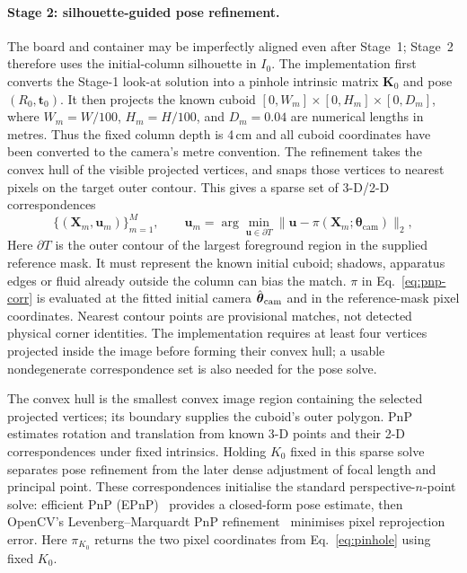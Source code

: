 \paragraph{Stage 2: silhouette-guided pose refinement.}
The board and container may be imperfectly aligned even after
Stage~1; Stage~2 therefore uses the
initial-column silhouette in $I_0$. The implementation
first converts the Stage-1 look-at solution into a pinhole intrinsic
matrix $\mathbf{K}_0$ and pose $(R_0,\mathbf{t}_0)$. It then projects the
known cuboid $[0,W_m]\times[0,H_m]\times[0,D_m]$, where
$W_m=W/100$, $H_m=H/100$, and $D_m=0.04$ are numerical lengths
in metres. Thus the fixed column depth is 4\,cm and all cuboid
coordinates have been converted to the camera's metre convention.
The refinement takes the convex
hull of the visible
projected vertices, and snaps those vertices to nearest pixels on the
target outer contour. This gives a sparse set of 3-D/2-D
correspondences
\begin{equation}
\label{eq:pnp-corr}
    \{(\mathbf{X}_m,\mathbf{u}_m)\}_{m=1}^{M},
    \qquad
    \mathbf{u}_m
    =
    \arg\min_{\mathbf{u}\in\partial T}
    \|\mathbf{u}-\pi(\mathbf{X}_m;\boldsymbol{\theta}_{\mathrm{cam}})\|_2 ,
\end{equation}
Here $\partial T$ is the outer contour of the largest foreground
region in the supplied reference mask. It must represent the known
initial cuboid; shadows, apparatus edges or fluid already outside the
column can bias the match. $\pi$ in Eq.~\eqref{eq:pnp-corr} is evaluated
at the fitted initial camera $\hat{\boldsymbol\theta}_{\rm cam}$ and
in the reference-mask pixel coordinates. Nearest contour points are
provisional matches, not detected physical corner identities. The
implementation requires at least four vertices projected inside the
image before forming their convex hull; a usable nondegenerate
correspondence set is also needed for the pose solve.

The convex hull is the smallest convex image region containing the
selected projected vertices; its boundary supplies the cuboid's
outer polygon. PnP estimates rotation and translation from known
3-D points and their 2-D correspondences under fixed intrinsics.
Holding $K_0$ fixed in this sparse solve separates pose refinement
from the later dense adjustment of focal length and principal point.
These correspondences initialise the standard
perspective-$n$-point solve: efficient PnP (EPnP)~\cite{lepetit2009epnp} provides a
closed-form pose estimate, then OpenCV's Levenberg--Marquardt PnP
refinement~\cite{levenberg1944method,marquardt1963algorithm} minimises
pixel reprojection error. Here $\pi_{K_0}$ returns the two pixel
coordinates from Eq.~\eqref{eq:pinhole} using fixed $K_0$.


